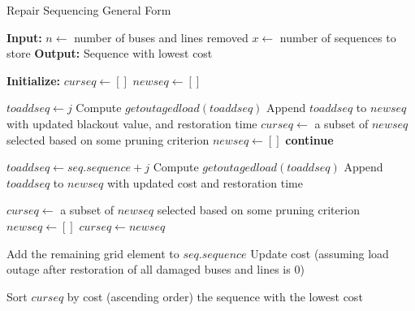 \documentclass[12pt]{article}
\begin{document}
\begin{algorithm}
    \small
    \caption{Repair Sequencing General Form}
    \label{alg:pruning}
    \begin{algorithmic}[1]
    \State \textbf{Input:} 
    \State \quad $n \gets$ number of buses and lines removed
    \State \quad $x \gets$ number of sequences to store
    \State \textbf{Output:} Sequence with lowest cost
    
    \State \textbf{Initialize:} 
    \State \quad $curseq \gets []$ 
    \State \quad $newseq \gets []$ 
    
                \State $toaddseq \gets j$ 
                \State Compute $getoutagedload(toaddseq)$ 
                \State Append $toaddseq$ to $newseq$ with updated blackout value, and restoration time
            \EndFor
            \State $curseq \gets$ a subset of $newseq$ selected based on some pruning criterion
            \State $newseq \gets []$ 
            \State \textbf{continue}
        \EndIf
        
                    \State $toaddseq \gets seq.sequence + j$ 
                    \State Compute $getoutagedload(toaddseq)$ 
                    \State Append $toaddseq$ to $newseq$ with updated cost and restoration time
                \EndIf
            \EndFor
        \EndFor
        
            \State $curseq \gets$ a subset of $newseq$ selected based on some pruning criterion
            \State $newseq \gets []$ 
        \Else
            \State $curseq \gets newseq$ 
        \EndIf
    \EndFor
    
        \State Add the remaining grid element to $seq.sequence$
        \State Update cost (assuming load outage after restoration of all damaged buses and lines is 0)
    \EndFor
    
    \State Sort $curseq$ by cost (ascending order)
    \State \Return the sequence with the lowest cost
    
    \end{algorithmic}
\end{algorithm}
\end{document}
